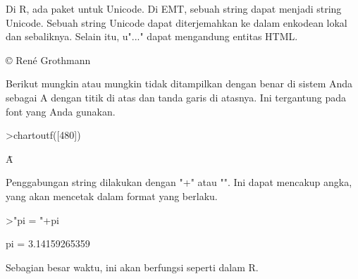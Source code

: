 \documentclass[12pt,arial,letterpaper]{book}
\begin{document}
\begin{eulercomment}
\begin{eulercomment}
\begin{eulercomment}
\begin{eulercomment}
\begin{eulercomment}
\begin{eulercomment}
\begin{eulercomment}
\begin{eulercomment}
\begin{eulercomment}
\begin{eulercomment}
\begin{eulercomment}
\begin{eulercomment}
\begin{eulercomment}
\begin{eulercomment}
\begin{eulercomment}
\begin{eulercomment}
\begin{eulercomment}
\begin{eulercomment}
\begin{eulercomment}
\begin{eulercomment}
\begin{eulercomment}
\begin{eulercomment}
\begin{eulercomment}
\begin{eulercomment}
\begin{eulercomment}
\begin{eulercomment}
\begin{eulercomment}
\begin{eulercomment}
\begin{eulercomment}
\begin{eulercomment}
\begin{eulercomment}
\begin{eulercomment}
\begin{eulercomment}
\begin{eulercomment}
\begin{eulercomment}
\begin{eulercomment}
\begin{eulercomment}
Di R, ada paket untuk Unicode. Di EMT, sebuah string dapat menjadi
string Unicode. Sebuah string Unicode dapat diterjemahkan ke dalam
enkodean lokal dan sebaliknya. Selain itu, u"..." dapat mengandung
entitas HTML.
\end{eulercomment}
\begin{euleroutput}
  © René Grothmann
\end{euleroutput}
\begin{eulercomment}
Berikut mungkin atau mungkin tidak ditampilkan dengan benar di sistem
Anda sebagai A dengan titik di atas dan tanda garis di atasnya. Ini
tergantung pada font yang Anda gunakan.
\end{eulercomment}
\begin{eulerprompt}
>chartoutf([480])
\end{eulerprompt}
\begin{euleroutput}
  Ǡ
\end{euleroutput}
\begin{eulercomment}
Penggabungan string dilakukan dengan "+" atau "\textbar{}". Ini dapat mencakup
angka, yang akan mencetak dalam format yang berlaku.
\end{eulercomment}
\begin{eulerprompt}
>"pi = "+pi
\end{eulerprompt}
\begin{euleroutput}
  pi = 3.14159265359
\end{euleroutput}
\begin{eulercomment}
Sebagian besar waktu, ini akan berfungsi seperti dalam R.


\end{eulercomment}
\end{eulercomment}
\end{eulercomment}
\end{eulercomment}
\end{eulercomment}
\end{eulercomment}
\end{eulercomment}
\end{eulercomment}
\end{eulercomment}
\end{eulercomment}
\end{eulercomment}
\end{eulercomment}
\end{eulercomment}
\end{eulercomment}
\end{eulercomment}
\end{eulercomment}
\end{eulercomment}
\end{eulercomment}
\end{eulercomment}
\end{eulercomment}
\end{eulercomment}
\end{eulercomment}
\end{eulercomment}
\end{eulercomment}
\end{eulercomment}
\end{eulercomment}
\end{eulercomment}
\end{eulercomment}
\end{eulercomment}
\end{eulercomment}
\end{eulercomment}
\end{eulercomment}
\end{eulercomment}
\end{eulercomment}
\end{eulercomment}
\end{eulercomment}
\end{eulercomment}
\end{document}
